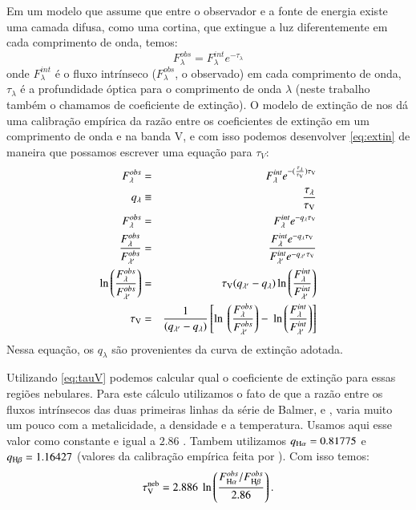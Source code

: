 Em um modelo que assume que entre o observador e a fonte de energia existe uma camada difusa, como
uma cortina, que extingue a luz diferentemente em cada comprimento de onda, temos:
\begin{equation}
	F_\lambda^{obs} = F_\lambda^{int} e^{-\tau_\lambda}
    \label{eq:extin}
\end{equation}
\noindent onde $F_\lambda^{int}$ é o fluxo intrínseco ($F_\lambda^{obs}$, o observado) em cada
comprimento de onda, $\tau_\lambda$ é a profundidade óptica para o comprimento de
onda $\lambda$ (neste trabalho também o chamamos de coeficiente de extinção). O modelo de extinção
de \citet{CCM1989a} nos dá uma calibração empírica da razão entre os coeficientes de extinção em um
comprimento de onda e na banda V, e com isso podemos desenvolver \eqref{eq:extin} de maneira que
possamos escrever uma equação para $\tau_V$:
\begin{eqnarray}
   F_\lambda^{obs} &=& F_\lambda^{int} e^{-(\frac{\tau_\lambda}{\tauV}) \tauV} \\
   q_\lambda &\equiv& \frac{\tau_\lambda}{\tauV} \\
   F_\lambda^{obs} &=& F_\lambda^{int} e^{-q_\lambda \tauV} \\
   \frac{F_\lambda^{obs}}{F_{\lambda^\prime}^{obs}} &=& \
 \frac{F_\lambda^{int} e^{-q_\lambda \tauV}}{F_{\lambda^\prime}^{int} e^{-q_{\lambda^\prime} \tauV}} \\
   \ln \left(\frac{F_\lambda^{obs}}{F_{\lambda^\prime}^{obs}}\right) &=& \
 \tauV (q_{\lambda^\prime} - q_\lambda) \ln \left(\frac{F_\lambda^{int}}{F_{\lambda^\prime}^{int}}\right) \\
   \tauV &=& \frac{1}{(q_{\lambda^\prime} - q_\lambda)} \left[\ln \ 
 \left(\frac{F_\lambda^{obs}}{F_{\lambda^\prime}^{obs}}\right) - \
 \ln \left(\frac{F_\lambda^{int}}{F_{\lambda^\prime}^{int}}\right)\right] 
 \label{eq:tauV}
\end{eqnarray}
\noindent Nessa equação, os $q_\lambda$ são provenientes da curva de extinção adotada.

Utilizando \eqref{eq:tauV} podemos calcular qual o coeficiente de extinção para essas regiões
nebulares. Para este cálculo utilizamos o fato de que a razão entre os fluxos intrínsecos das duas
primeiras linhas da série de Balmer, \Halpha e \Hbeta, varia muito um pouco com a metalicidade, a
densidade e a temperatura. Usamos aqui esse valor como constante e igual a $2.86$
\citep[densidade eletrônica de $n = 100\ cm^{-3}$ e temperatura eletrônica $T_e = 10^4$ K;
][]{Osterbrock.Ferland.2006a}. Tambem utilizamos $q_{\Halpha}  = 0.81775$ e $q_{\Hbeta} = 1.16427$
(valores da calibração empírica feita por \citeauthor{CCM1989a}). Com isso temos:
\begin{equation}
	\tauVN = 2.886\ \ln \left( \frac{F_{\Halpha}^{obs}/F_{\Hbeta}^{obs}}{2.86} \right).
\end{equation}

